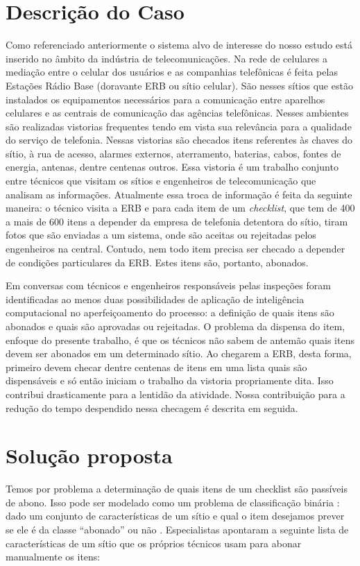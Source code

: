 \documentclass[
	12pt,				%
	openany,			%
	oneside,			%
	a4paper,			%
	english,			%
	french,				%
	spanish,			%
	brazil,				%
	]{abntex2}
\begin{document}
\chapter[Descrição do Caso]{Descrição do Caso}
Como referenciado anteriormente o sistema alvo de interesse do nosso estudo está
inserido no âmbito da indústria de telecomunicações. Na rede de celulares a
mediação entre o celular dos usuários e as companhias telefônicas é feita pelas
Estações Rádio Base (doravante ERB ou sítio celular). São nesses sítios que
estão instalados os equipamentos necessários para a comunicação entre aparelhos
celulares e as centrais de comunicação das agências telefônicas. Nesses
ambientes são realizadas vistorias frequentes tendo em vista sua relevância para
a qualidade do serviço de telefonia. Nessas vistorias são checados itens
referentes às chaves do sítio, à rua de acesso, alarmes externos, aterramento,
baterias, cabos, fontes de energia, antenas, dentre centenas outros. Essa
vistoria é um trabalho conjunto entre técnicos que visitam os sítios e
engenheiros de telecomunicação que analisam as informações. Atualmente essa
troca de informação é feita da seguinte maneira: o técnico visita a ERB e para
cada item de um \textit{checklist}, que tem de 400 a mais de 600 itens a
depender da empresa de telefonia detentora do sítio, tiram fotos que são
enviadas a um sistema, onde são aceitas ou rejeitadas pelos engenheiros na
central. Contudo, nem todo item precisa ser checado a depender de condições
particulares da ERB. Estes itens são, portanto, abonados.

Em conversas com técnicos e engenheiros responsáveis pelas inspeções foram
identificadas ao menos duas possibilidades de aplicação de inteligência
computacional no aperfeiçoamento do processo: a definição de quais itens são
abonados e quais são aprovadas ou rejeitadas. O problema da dispensa do item,
enfoque do presente trabalho, é que os técnicos não sabem de antemão quais itens
devem ser abonados em um determinado sítio. Ao chegarem a ERB, desta forma,
primeiro devem checar dentre centenas de itens em uma lista quais são
dispensáveis e só então iniciam o trabalho da vistoria propriamente dita. Isso
contribui drasticamente para a lentidão da atividade. Nossa contribuição para a
redução do tempo despendido nessa checagem é descrita em seguida.

\chapter[Solução proposta]{Solução proposta}
Temos por problema a determinação de quais itens de um checklist são passíveis
de abono. Isso pode ser modelado como um problema de classificação binária :
dado um conjunto de características de um sítio e qual o item desejamos prever
se ele é da classe ``abonado'' ou não \cite{james2013introduction}.
Especialistas apontaram a seguinte lista de características de um sítio que os
próprios técnicos usam para abonar manualmente os itens:
\end{document}
